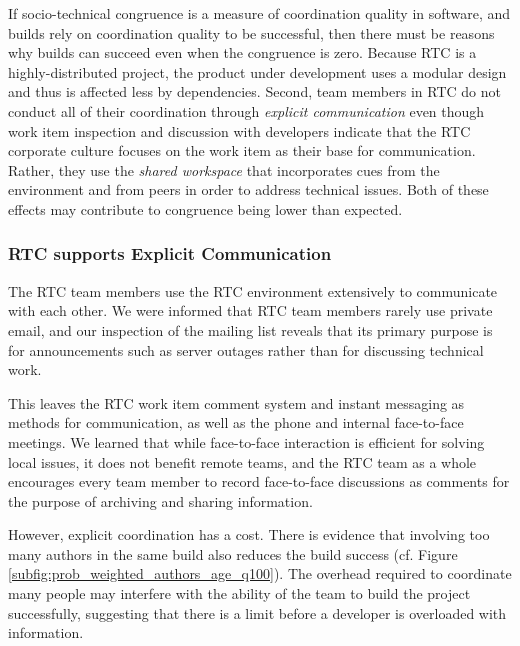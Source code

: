If socio-technical congruence is a measure of coordination quality in software, and builds rely on coordination quality to be successful, then there must be reasons why builds can succeed even when the congruence is zero.
Because RTC is a highly-distributed project, the product under development uses a modular design \cite{maccormack2006} and thus is affected less by dependencies. Second, team members in RTC do not conduct all of their coordination through \emph{explicit communication} even though work item inspection and discussion with developers indicate that the RTC corporate culture focuses on the work item as their base for communication. Rather, they use the \emph{shared workspace} that incorporates cues from the environment and from peers in order to address technical issues. Both of these effects may contribute to congruence being lower than expected.

\subsubsection{RTC supports Explicit Communication}
The RTC team members use the RTC environment extensively to communicate with each other. We were informed that RTC team members rarely use private email, and our inspection of the mailing list reveals that its primary purpose is for announcements such as server outages rather than for discussing technical work.

This leaves the RTC work item comment system and instant messaging as methods for communication, as well as the phone and internal face-to-face meetings.
We learned that while face-to-face interaction is efficient for solving local issues, it does not benefit remote teams, and the RTC team as a whole encourages every team member to record face-to-face discussions as comments for the purpose of archiving and sharing information.

However, explicit coordination has a cost. There is evidence that involving too many authors in the same build also reduces the build success (cf. Figure \ref{subfig:prob_weighted_authors_age_q100}). The overhead required to coordinate many people may interfere with the ability of the team to build the project successfully, suggesting that there is a limit before a developer is overloaded with information.

